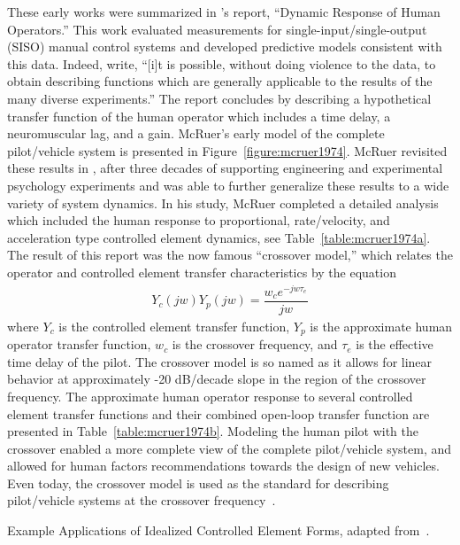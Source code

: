 These early works were summarized in \citeauthor{mcruer_dynamic_1957}'s report, ``Dynamic Response of Human Operators.''
This work evaluated measurements for single-input/single-output (SISO) manual control systems and developed predictive models consistent with this data.
Indeed, \citeauthor*{mcruer_dynamic_1957} write, ``[i]t is possible, without doing violence to the data, to obtain describing functions which are generally applicable to the results of the many diverse experiments.''
The report concludes by describing a hypothetical transfer function of the human operator which includes a time delay, a neuromuscular lag, and a gain.
McRuer's early model of the complete pilot/vehicle system is presented in Figure~\ref{figure:mcruer1974}.
McRuer revisited these results in \citeyear{mcruer_mathematical_1974}, after three decades of supporting engineering and experimental psychology experiments and was able to further generalize these results to a wide variety of system dynamics.
In his study, McRuer completed a detailed analysis which included the human response to proportional, rate/velocity, and acceleration type controlled element dynamics, see Table~\ref{table:mcruer1974a}.
The result of this report was the now famous ``crossover model,'' which relates the operator and controlled element transfer characteristics by the equation
\begin{align}
    Y_c(jw) Y_p(jw) = \dfrac{w_c e^{-jw \tau_e}}{jw}
\end{align}
where $Y_c$ is the controlled element transfer function, $Y_p$ is the approximate human operator transfer function, $w_c$ is the crossover frequency, and $\tau_e$ is the effective time delay of the pilot.
The crossover model is so named as it allows for linear behavior at approximately -20 dB/decade slope in the region of the crossover frequency.
The approximate human operator response to several controlled element transfer functions and their combined open-loop transfer function are presented in Table~\ref{table:mcruer1974b}.
Modeling the human pilot with the crossover enabled a more complete view of the complete pilot/vehicle system, and allowed for human factors recommendations towards the design of new vehicles.
Even today, the crossover model is used as the standard for describing pilot/vehicle systems at the crossover frequency~\citep{mcruer_human_1965, mcruer_mathematical_1974, xu_review_2017}.

\begin{table}[tb]
    \centering
    \caption[Example Applications of Idealized Controlled Element Forms]{Example Applications of Idealized Controlled Element Forms, adapted from~\citet{mcruer_mathematical_1974}.}
    \label{table:mcruer1974a}
\end{table}

